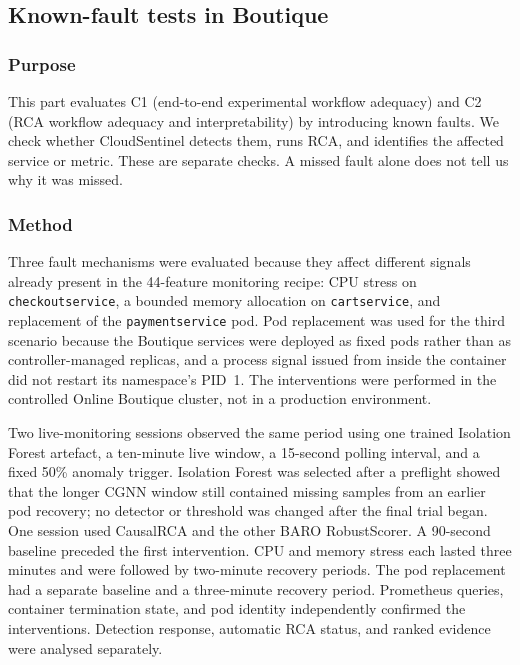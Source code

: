 \subsection{Known-fault tests in Boutique}

\subsubsection{Purpose}

This part evaluates C1 (end-to-end experimental workflow adequacy) and C2 (RCA workflow adequacy and interpretability) by introducing known faults. We check whether CloudSentinel detects them, runs RCA, and identifies the affected service or metric. These are separate checks. A missed fault alone does not tell us why it was missed.

\subsubsection{Method}

Three fault mechanisms were evaluated because they affect different signals already present in the 44-feature monitoring recipe: CPU stress on \texttt{checkoutservice}, a bounded memory allocation on \texttt{cartservice}, and replacement of the \texttt{paymentservice} pod. Pod replacement was used for the third scenario because the Boutique services were deployed as fixed pods rather than as controller-managed replicas, and a process signal issued from inside the container did not restart its namespace's PID~1. The interventions were performed in the controlled Online Boutique cluster, not in a production environment.

Two live-monitoring sessions observed the same period using one trained Isolation Forest artefact, a ten-minute live window, a 15-second polling interval, and a fixed 50\% anomaly trigger. Isolation Forest was selected after a preflight showed that the longer CGNN window still contained missing samples from an earlier pod recovery; no detector or threshold was changed after the final trial began. One session used CausalRCA and the other BARO RobustScorer. A 90-second baseline preceded the first intervention. CPU and memory stress each lasted three minutes and were followed by two-minute recovery periods. The pod replacement had a separate baseline and a three-minute recovery period. Prometheus queries, container termination state, and pod identity independently confirmed the interventions. Detection response, automatic RCA status, and ranked evidence were analysed separately.

